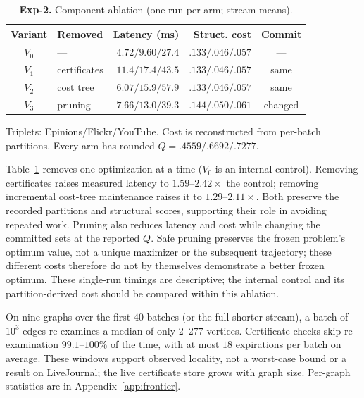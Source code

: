 \begin{table}[tb]
\centering
\caption{\textbf{Exp-2.} Component ablation (one run per arm; stream means).}
\label{tab:ablation}
\begin{scriptsize}
\setlength{\tabcolsep}{0.25em}
\begin{tabular*}{\linewidth}{@{\extracolsep{\fill}}clrrc@{}}
\toprule
Variant & Removed & Latency (ms) & Struct. cost & Commit \\
\midrule
$V_0$ & ---          & $4.72/9.60/27.4$ & $.133/.046/.057$ & --- \\
\midrule
$V_1$ & certificates & $11.4/17.4/43.5$ & $.133/.046/.057$ & same \\
$V_2$ & cost tree    & $6.07/15.9/57.9$ & $.133/.046/.057$ & same \\
$V_3$ & pruning      & $7.66/13.0/39.3$ & $.144/.050/.061$ & changed \\
\bottomrule
\end{tabular*}
\par\smallskip\raggedright
Triplets: Epinions/Flickr/YouTube. Cost is reconstructed from per-batch
partitions. Every arm has rounded $Q=.4559/.6692/.7277$.
\end{scriptsize}
\end{table}

Table~\ref{tab:ablation} removes one optimization at a time
($V_0$ is an internal control). Removing certificates raises measured
latency to $1.59$--$2.42\times$ the control; removing incremental cost-tree
maintenance raises it to $1.29$--$2.11\times$. Both preserve the recorded partitions
and structural scores, supporting their role in avoiding repeated work. Pruning also reduces latency and cost while changing the committed sets
at the reported $Q$. Safe pruning preserves the frozen problem's optimum
value, not a unique maximizer or the subsequent trajectory; these different
costs therefore do not by themselves demonstrate a better frozen optimum.
These single-run timings are descriptive; the internal control and its
partition-derived cost should be compared within this ablation.

 On nine graphs over the first
$40$ batches (or the full shorter stream), a batch of $10^3$ edges
re-examines a median of only $2$--$277$ vertices. Certificate checks skip
re-examination $99.1$--$100\%$ of the time, with at most $18$ expirations per
batch on average. These windows support observed locality, not a worst-case
bound or a result on LiveJournal; the live certificate store grows with
graph size. Per-graph statistics are in Appendix~\ref{app:frontier}.

